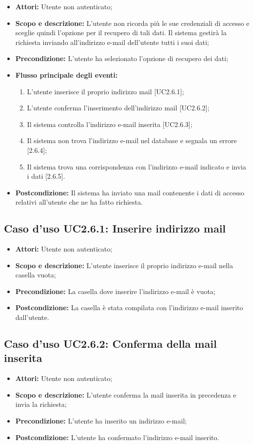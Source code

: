 \begin{itemize}
	\item \textbf{Attori:} Utente non autenticato;
	\item \textbf{Scopo e descrizione:} L'utente non ricorda più le sue credenziali di accesso e sceglie quindi l'opzione per il recupero di tali dati. Il sistema gestirà la richiesta inviando all'indirizzo e-mail dell'utente tutti i suoi dati;
	\item \textbf{Precondizione:} L'utente ha selezionato l'opzione di recupero dei dati;
	\item \textbf{Flusso principale degli eventi:}
	\begin{enumerate}
		\item L'utente inserisce il proprio indirizzo mail [UC2.6.1];
		\item L'utente conferma l'inserimento dell'indirizzo mail [UC2.6.2];
		\item Il sistema controlla l'indirizzo e-mail inserita [UC2.6.3];
		\item Il sistema non trova l'indirizzo e-mail nel \gls{database} e segnala un errore [2.6.4];
		\item Il sistema trova una corrispondenza con l'indirizzo e-mail indicato e invia i dati [2.6.5].
	\end{enumerate}
	\item \textbf{Postcondizione:} Il sistema ha inviato una mail contenente i dati di accesso relativi all'utente che ne ha fatto richiesta.
\end{itemize}

\subsection{Caso d'uso UC2.6.1: Inserire indirizzo mail}
\begin{itemize}
	\item \textbf{Attori:} Utente non autenticato;
	\item \textbf{Scopo e descrizione:} L'utente inserisce il proprio indirizzo e-mail nella casella vuota;
	\item \textbf{Precondizione:} La casella dove inserire l'indirizzo e-mail è vuota;
	\item \textbf{Postcondizione:} La casella è stata compilata con l'indirizzo e-mail inserito dall'utente.
\end{itemize}

\subsection{Caso d'uso UC2.6.2: Conferma della mail inserita}
\begin{itemize}
	\item \textbf{Attori:} Utente non autenticato;
	\item \textbf{Scopo e descrizione:} L'utente conferma la mail inserita in precedenza e invia la richiesta;
	\item \textbf{Precondizione:} L'utente ha inserito un indirizzo e-mail;
	\item \textbf{Postcondizione:} L'utente ha confermato l'indirizzo e-mail inserito.
\end{itemize}

